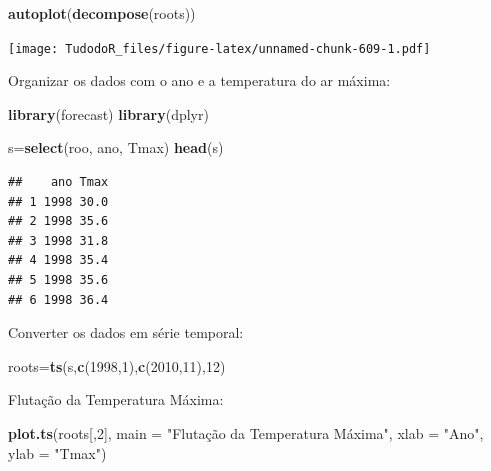 \documentclass[
]{book}
\newenvironment{Shaded}{\begin{snugshade}}{\end{snugshade}}
\newcommand{\DataTypeTok}[1]{\textcolor[rgb]{0.13,0.29,0.53}{#1}}
\newcommand{\DecValTok}[1]{\textcolor[rgb]{0.00,0.00,0.81}{#1}}
\newcommand{\KeywordTok}[1]{\textcolor[rgb]{0.13,0.29,0.53}{\textbf{#1}}}
\newcommand{\NormalTok}[1]{#1}
\newcommand{\StringTok}[1]{\textcolor[rgb]{0.31,0.60,0.02}{#1}}
\begin{document}
\begin{Shaded}
\begin{Highlighting}[]
\KeywordTok{autoplot}\NormalTok{(}\KeywordTok{decompose}\NormalTok{(roots))}
\end{Highlighting}
\end{Shaded}

\texttt{[image: TudodoR\_files/figure-latex/unnamed-chunk-609-1.pdf]}

Organizar os dados com o ano e a temperatura do ar máxima:

\begin{Shaded}
\begin{Highlighting}[]
\KeywordTok{library}\NormalTok{(forecast)}
\KeywordTok{library}\NormalTok{(dplyr)}
\end{Highlighting}
\end{Shaded}

\begin{Shaded}
\begin{Highlighting}[]
\NormalTok{s=}\KeywordTok{select}\NormalTok{(roo, ano, Tmax)}
\KeywordTok{head}\NormalTok{(s)}
\end{Highlighting}
\end{Shaded}

\begin{verbatim}
##    ano Tmax
## 1 1998 30.0
## 2 1998 35.6
## 3 1998 31.8
## 4 1998 35.4
## 5 1998 35.6
## 6 1998 36.4
\end{verbatim}

Converter os dados em série temporal:

\begin{Shaded}
\begin{Highlighting}[]
\NormalTok{roots=}\KeywordTok{ts}\NormalTok{(s,}\KeywordTok{c}\NormalTok{(}\DecValTok{1998}\NormalTok{,}\DecValTok{1}\NormalTok{),}\KeywordTok{c}\NormalTok{(}\DecValTok{2010}\NormalTok{,}\DecValTok{11}\NormalTok{),}\DecValTok{12}\NormalTok{)}
\end{Highlighting}
\end{Shaded}

Flutação da Temperatura Máxima:

\begin{Shaded}
\begin{Highlighting}[]
\KeywordTok{plot.ts}\NormalTok{(roots[,}\DecValTok{2}\NormalTok{], }\DataTypeTok{main =} \StringTok{"Flutação da Temperatura Máxima"}\NormalTok{, }\DataTypeTok{xlab =} \StringTok{"Ano"}\NormalTok{, }\DataTypeTok{ylab =} \StringTok{"Tmax"}\NormalTok{)}
\end{Highlighting}
\end{Shaded}
\end{document}
